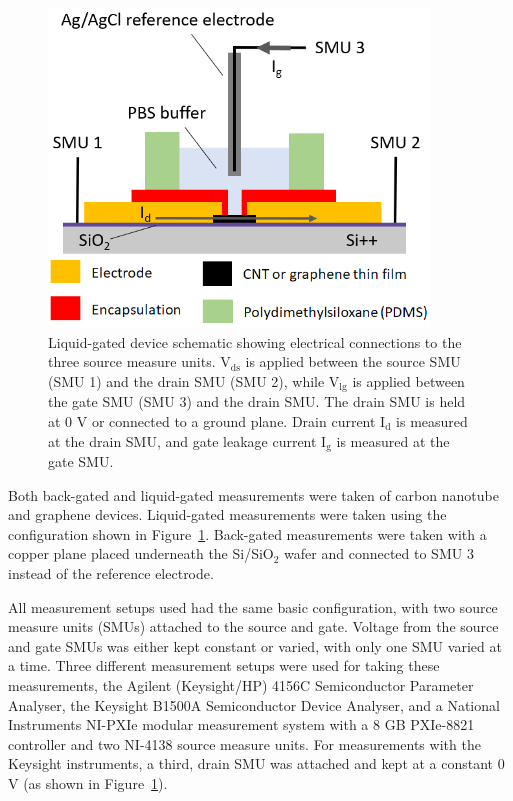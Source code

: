\documentclass[
  letterpaper,
  DIV=11,
  numbers=noendperiod]{scrartcl}
\begin{document}
\begin{figure}

{\centering \includegraphics[width=0.9\textwidth,height=\textheight]{figures/ch4/liquid-gate-schematic.png}

}

\caption{\label{fig-liquid-gate-schematic}Liquid-gated device schematic
showing electrical connections to the three source measure units.
V\(_{\mathrm{ds}}\) is applied between the source SMU (SMU 1) and the
drain SMU (SMU 2), while V\(_{\mathrm{lg}}\) is applied between the gate
SMU (SMU 3) and the drain SMU. The drain SMU is held at 0 V or connected
to a ground plane. Drain current I\(_{\mathrm{d}}\) is measured at the
drain SMU, and gate leakage current I\(_{\mathrm{g}}\) is measured at
the gate SMU.}

\end{figure}

Both back-gated and liquid-gated measurements were taken of carbon
nanotube and graphene devices. Liquid-gated measurements were taken
using the configuration shown in Figure~\ref{fig-liquid-gate-schematic}.
Back-gated measurements were taken with a copper plane placed underneath
the Si/SiO\(_2\) wafer and connected to SMU 3 instead of the reference
electrode.

All measurement setups used had the same basic configuration, with two
source measure units (SMUs) attached to the source and gate. Voltage
from the source and gate SMUs was either kept constant or varied, with
only one SMU varied at a time. Three different measurement setups were
used for taking these measurements, the Agilent (Keysight/HP) 4156C
Semiconductor Parameter Analyser, the Keysight B1500A Semiconductor
Device Analyser, and a National Instruments NI-PXIe modular measurement
system with a 8 GB PXIe-8821 controller and two NI-4138 source measure
units. For measurements with the Keysight instruments, a third, drain
SMU was attached and kept at a constant 0 V (as shown in
Figure~\ref{fig-liquid-gate-schematic}).
\end{document}
